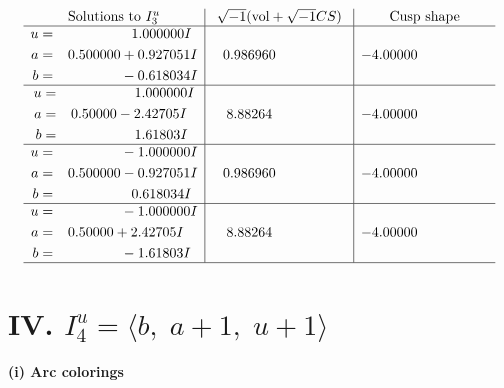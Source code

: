 \documentclass[1p]{elsarticle_modified}
\theoremstyle{definition}
\newcommand{\I}{\sqrt{-1}}
\begin{document}
$$\begin{array}{c|c|c}  
\text{Solutions to }I^u_{3}& \I (\text{vol} + \sqrt{-1}CS) & \text{Cusp shape}\\
 \hline 
\begin{aligned}
u &= \phantom{-0.000000 -}1.000000 I \\
a &= \phantom{-}0.500000 + 0.927051 I \\
b &= \phantom{-0.000000 } -0.618034 I\end{aligned}
 & \phantom{-}0.986960\phantom{ +0.000000I} & -4.00000\phantom{ +0.000000I} \\ \hline\begin{aligned}
u &= \phantom{-0.000000 -}1.000000 I \\
a &= \phantom{-}0.50000 - 2.42705 I \\
b &= \phantom{-0.000000 -}1.61803 I\end{aligned}
 & \phantom{-}8.88264\phantom{ +0.000000I} & -4.00000\phantom{ +0.000000I} \\ \hline\begin{aligned}
u &= \phantom{-0.000000 } -1.000000 I \\
a &= \phantom{-}0.500000 - 0.927051 I \\
b &= \phantom{-0.000000 -}0.618034 I\end{aligned}
 & \phantom{-}0.986960\phantom{ +0.000000I} & -4.00000\phantom{ +0.000000I} \\ \hline\begin{aligned}
u &= \phantom{-0.000000 } -1.000000 I \\
a &= \phantom{-}0.50000 + 2.42705 I \\
b &= \phantom{-0.000000 } -1.61803 I\end{aligned}
 & \phantom{-}8.88264\phantom{ +0.000000I} & -4.00000\phantom{ +0.000000I}\\
 \hline 
 \end{array}$$\newpage\newpage\renewcommand{\arraystretch}{1}
\centering \section*{IV. $I^u_{4}= \langle b,\;a+1,\;u+1 \rangle$}
\flushleft \textbf{(i) Arc colorings}\\
\end{document}

